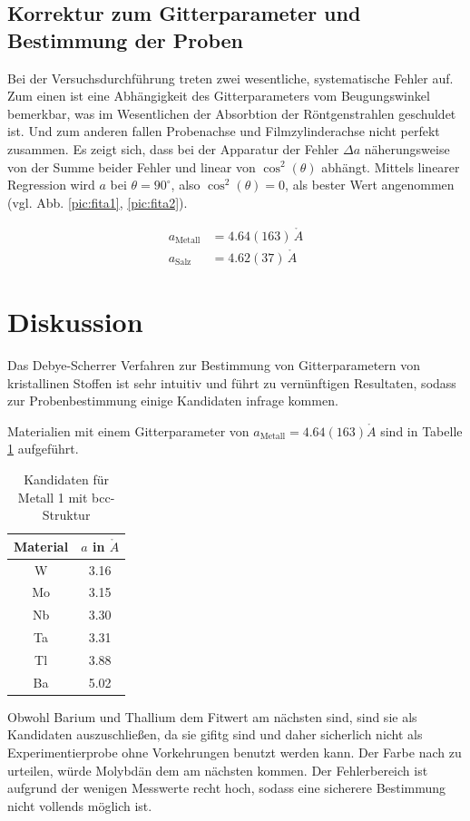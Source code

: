 \subsection{Korrektur zum Gitterparameter und Bestimmung der Proben}
Bei der Versuchsdurchführung treten zwei wesentliche, systematische Fehler auf. Zum einen ist eine Abhängigkeit des Gitterparameters vom Beugungswinkel
bemerkbar,
was im Wesentlichen der Absorbtion der Röntgenstrahlen geschuldet ist. Und zum anderen fallen Probenachse und Filmzylinderachse nicht perfekt zusammen.
Es zeigt sich, dass bei der Apparatur der Fehler $\Delta a$ näherungsweise von der Summe beider Fehler und linear von $\cos^2(\theta)$ abhängt. Mittels
linearer Regression wird $a$ bei $\theta = 90^\circ$, also $\cos^2(\theta)=0$, als bester Wert angenommen (vgl. Abb. \ref{pic:fita1}, \ref{pic:fita2}). 

\begin{align}
 a_\text{Metall} &= 4.64(163)\, \mathring{A} \\
 \nonumber
 a_\text{Salz} &= 4.62(37)\, \mathring{A} 
 \label{eq:latticeResults}
\end{align}

\noindent
\section{Diskussion}
Das Debye-Scherrer Verfahren zur Bestimmung von Gitterparametern von kristallinen Stoffen ist sehr intuitiv und führt zu vernünftigen Resultaten, sodass
zur Probenbestimmung einige Kandidaten infrage kommen. 

\noindent Materialien mit einem Gitterparameter von $a_\text{Metall} = 4.64(163) \mathring{A}$ sind in Tabelle \ref{tab:matProb1} 
aufgeführt.

\begin{table}[H]
 \begin{tabular}{cc}
Material &$a$ in $\mathring{A}$\\
\hline
W&3.16\\ 
Mo& 3.15\\ 
Nb & 3.30\\ 
Ta & 3.31\\ 
Tl & 3.88\\ 
Ba & 5.02\\ 
  
 \end{tabular}
 \caption{Kandidaten für Metall 1 mit bcc-Struktur \cite{Gitterparameter}}
 \label{tab:matProb1}

\end{table}
\noindent Obwohl Barium und Thallium dem Fitwert am nächsten sind, sind sie als Kandidaten auszuschließen, da sie gifitg sind und daher sicherlich nicht
als Experimentierprobe ohne Vorkehrungen benutzt werden kann. Der Farbe nach zu urteilen, würde Molybdän dem am nächsten kommen. Der Fehlerbereich ist
aufgrund der wenigen Messwerte recht hoch, sodass eine sicherere Bestimmung nicht vollends möglich ist.

